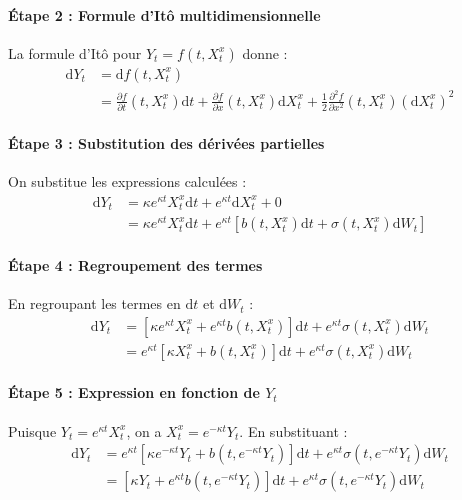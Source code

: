 \documentclass[12pt,a4paper]{article}
\theoremstyle{definition}
\theoremstyle{remark}
\newcommand{\dd}{\mathrm{d}}
\begin{document}
\paragraph{Étape 2 : Formule d'Itô multidimensionnelle}
La formule d'Itô pour $Y_t = f(t, X_t^x)$ donne :
\begin{align*}
\dd Y_t &= \dd f(t, X_t^x) \\
&= \frac{\partial f}{\partial t}(t, X_t^x)\dd t + \frac{\partial f}{\partial x}(t, X_t^x)\dd X_t^x + \frac{1}{2}\frac{\partial^2 f}{\partial x^2}(t, X_t^x)(\dd X_t^x)^2
\end{align*}

\paragraph{Étape 3 : Substitution des dérivées partielles}
On substitue les expressions calculées :
\begin{align*}
\dd Y_t &= \kappa e^{\kappa t}X_t^x \dd t + e^{\kappa t}\dd X_t^x + 0 \\
&= \kappa e^{\kappa t}X_t^x \dd t + e^{\kappa t}[b(t, X_t^x)\dd t + \sigma(t, X_t^x)\dd W_t]
\end{align*}

\paragraph{Étape 4 : Regroupement des termes}
En regroupant les termes en $\dd t$ et $\dd W_t$ :
\begin{align*}
\dd Y_t &= [\kappa e^{\kappa t}X_t^x + e^{\kappa t}b(t, X_t^x)]\dd t + e^{\kappa t}\sigma(t, X_t^x)\dd W_t \\
&= e^{\kappa t}[\kappa X_t^x + b(t, X_t^x)]\dd t + e^{\kappa t}\sigma(t, X_t^x)\dd W_t
\end{align*}

\paragraph{Étape 5 : Expression en fonction de $Y_t$}
Puisque $Y_t = e^{\kappa t}X_t^x$, on a $X_t^x = e^{-\kappa t}Y_t$. En substituant :
\begin{align*}
\dd Y_t &= e^{\kappa t}[\kappa e^{-\kappa t}Y_t + b(t, e^{-\kappa t}Y_t)]\dd t + e^{\kappa t}\sigma(t, e^{-\kappa t}Y_t)\dd W_t \\
&= [\kappa Y_t + e^{\kappa t}b(t, e^{-\kappa t}Y_t)]\dd t + e^{\kappa t}\sigma(t, e^{-\kappa t}Y_t)\dd W_t
\end{align*}
\end{document}
